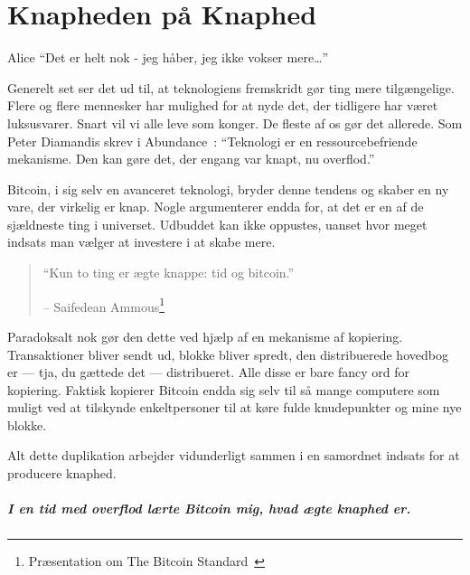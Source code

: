 
\chapter{Knapheden på Knaphed}
\label{les:2}

\begin{chapquote}{Alice}
\enquote{Det er helt nok - jeg håber, jeg ikke vokser mere\ldots}
\end{chapquote}

Generelt set ser det ud til, at teknologiens fremskridt gør ting mere 
tilgængelige. Flere og flere mennesker har mulighed for at nyde det, der 
tidligere har været luksusvarer. Snart vil vi alle leve som konger. De fleste 
af os gør det allerede. Som Peter Diamandis skrev i Abundance~\cite{abundance}: 
\enquote{Teknologi er en ressourcebefriende mekanisme. Den kan gøre det, der 
engang var knapt, nu overflod.}

Bitcoin, i sig selv en avanceret teknologi, bryder denne tendens og skaber en 
ny vare, der virkelig er knap. Nogle argumenterer endda for, at det er en af 
de sjældneste ting i universet. Udbuddet kan ikke oppustes, uanset hvor meget 
indsats man vælger at investere i at skabe mere.

\begin{quotation}\begin{samepage}
\enquote{Kun to ting er ægte knappe: tid og bitcoin.}
\begin{flushright} -- Saifedean Ammous\footnote{Præsentation om The Bitcoin 
    Standard~\cite{bitcoinstandard-pres}}
\end{flushright}\end{samepage}\end{quotation}

Paradoksalt nok gør den dette ved hjælp af en mekanisme af kopiering. 
Transaktioner bliver sendt ud, blokke bliver spredt, den distribuerede hovedbog 
er --- tja, du gættede det --- distribueret. Alle disse er bare fancy ord for 
kopiering. Faktisk kopierer Bitcoin endda sig selv til så mange computere som 
muligt ved at tilskynde enkeltpersoner til at køre fulde knudepunkter og mine 
nye blokke.

Alt dette duplikation arbejder vidunderligt sammen i en samordnet indsats for 
at producere knaphed.

\paragraph{I en tid med overflod lærte Bitcoin mig, hvad ægte knaphed er.}

